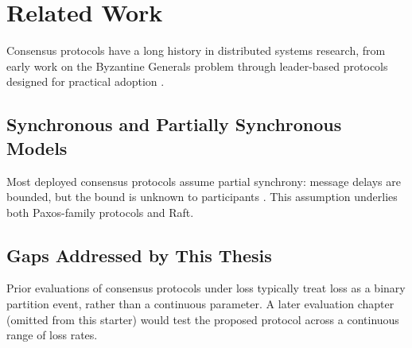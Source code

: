 \chapter{Related Work}
Consensus protocols have a long history in distributed systems research, from
early work on the Byzantine Generals problem \cite{Lamport1982} through
leader-based protocols designed for practical adoption \cite{Ongaro2014}.

\section{Synchronous and Partially Synchronous Models}
Most deployed consensus protocols assume partial synchrony: message delays are
bounded, but the bound is unknown to participants \cite{Fischer1985}. This
assumption underlies both Paxos-family protocols and Raft.

\section{Gaps Addressed by This Thesis}
Prior evaluations of consensus protocols under loss typically treat loss as a
binary partition event, rather than a continuous parameter. A later evaluation
chapter (omitted from this starter) would test the proposed protocol across a
continuous range of loss rates.
